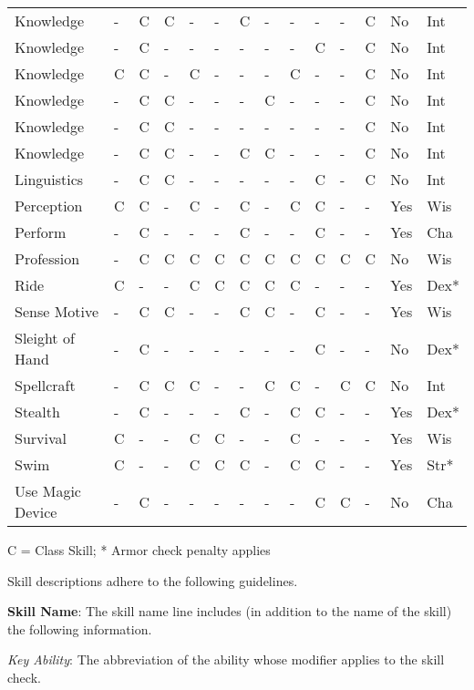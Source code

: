 \begin{table*}[]
\begin{tabular}{llllllllllllll}
Knowledge & - & C & C & - & - & C & - & - & - & - & C & No & Int\\
Knowledge & - & C & - & - & - & - & - & - & C & - & C & No & Int\\
Knowledge & C & C & - & C & - & - & - & C & - & - & C & No & Int\\
Knowledge & - & C & C & - & - & - & C & - & - & - & C & No & Int\\
Knowledge & - & C & C & - & - & - & - & - & - & - & C & No & Int\\
Knowledge & - & C & C & - & - & C & C & - & - & - & C & No & Int\\
Linguistics & - & C & C & - & - & - & - & - & C & - & C & No & Int\\
Perception & C & C & - & C & - & C & - & C & C & - & - & Yes & Wis\\
Perform & - & C & - & - & - & C & - & - & C & - & - & Yes & Cha\\
Profession & - & C & C & C & C & C & C & C & C & C & C & No & Wis\\
Ride & C & - & - & C & C & C & C & C & - & - & - & Yes & Dex*\\
Sense Motive & - & C & C & - & - & C & C & - & C & - & - & Yes & Wis\\
Sleight of Hand & - & C & - & - & - & - & - & - & C & - & - & No & Dex*\\
Spellcraft & - & C & C & C & - & - & C & C & - & C & C & No & Int\\
Stealth & - & C & - & - & - & C & - & C & C & - & - & Yes & Dex*\\
Survival & C & - & - & C & C & - & - & C & - & - & - & Yes & Wis\\
Swim & C & - & - & C & C & C & - & C & C & - & - & Yes & Str*\\
Use Magic Device & - & C & - & - & - & - & - & - & C & C & - & No & Cha\\
\end{tabular}
 C = Class Skill; * Armor check penalty applies\\
\end{table*}

				
Skill descriptions adhere to the following guidelines.
				
\textbf{Skill Name}: The skill name line includes (in addition to the name of the skill) the following information.
				
\textit{Key Ability}: The abbreviation of the ability whose modifier applies to the skill check.\newline
				
